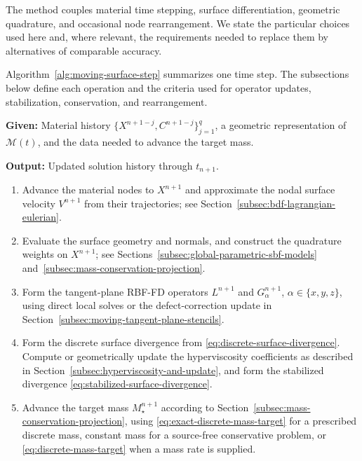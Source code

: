 \documentclass[a4paper,fleqn]{cas-sc}
\begin{document}
The method couples material time stepping, surface differentiation, geometric
quadrature, and occasional node rearrangement.  We state the particular
choices used here and, where relevant, the requirements needed to replace
them by alternatives of comparable accuracy.


Algorithm~\ref{alg:moving-surface-step} summarizes one time step.  The
subsections below define each operation and the criteria used for operator
updates, stabilization, conservation, and rearrangement.

\begin{algorithm}[t]
\caption{One time step of the moving-surface RBF-FD method}
\label{alg:moving-surface-step}
\textbf{Given:} Material history
$\{X^{n+1-j},C^{n+1-j}\}_{j=1}^q$, a geometric representation of
$\mathcal M(t)$, and the data needed to advance the target mass.\par
\textbf{Output:} Updated solution history through $t_{n+1}$.
\begin{enumerate}
  \item Advance the material nodes to $X^{n+1}$ and approximate the nodal
  surface velocity $V^{n+1}$ from their trajectories; see
  Section~\ref{subsec:bdf-lagrangian-eulerian}.

  \item Evaluate the surface geometry and normals, and construct the quadrature
  weights on $X^{n+1}$; see Sections~\ref{subsec:global-parametric-sbf-models}
  and~\ref{subsec:mass-conservation-projection}.

  \item Form the tangent-plane RBF-FD operators $L^{n+1}$ and
  $G_\alpha^{n+1}$, $\alpha\in\{x,y,z\}$, using direct local solves or the
  defect-correction update in Section~\ref{subsec:moving-tangent-plane-stencils}.

  \item Form the discrete surface divergence from
  \eqref{eq:discrete-surface-divergence}.  Compute or geometrically update the
  hyperviscosity coefficients as described in
  Section~\ref{subsec:hyperviscosity-and-update}, and form the stabilized
  divergence \eqref{eq:stabilized-surface-divergence}.

  \item Advance the target mass $M_\star^{n+1}$ according to
  Section~\ref{subsec:mass-conservation-projection}, using
  \eqref{eq:exact-discrete-mass-target} for a prescribed discrete mass,
  constant mass for a source-free conservative problem, or
  \eqref{eq:discrete-mass-target} when a mass rate is supplied.


\end{enumerate}
\end{algorithm}
\end{document}
